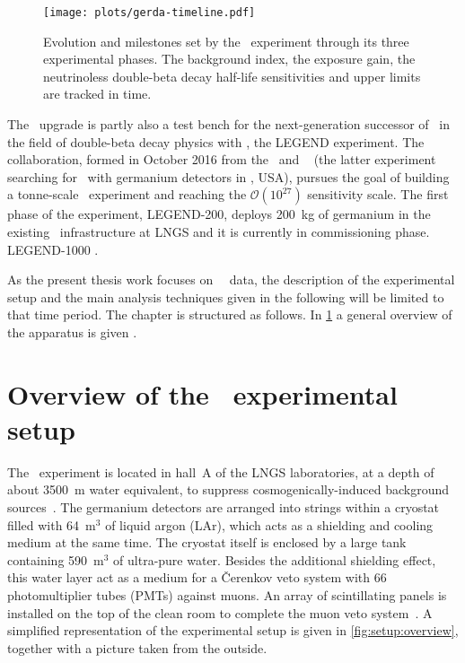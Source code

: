 \begin{figure}
  \centering
  \texttt{[image: plots/gerda-timeline.pdf]}
  \caption{%
    Evolution and milestones set by the \gerda\ experiment through its three experimental
    phases. The background index, the exposure gain, the neutrinoless double-beta decay
    half-life sensitivities and upper limits are tracked in time.
  }
\end{figure}

The \phasetwop\ upgrade is partly also a test bench for the next-generation successor of
\gerda\ in the field of double-beta decay physics with \gesix, the LEGEND experiment. The
collaboration, formed in October 2016 from the \gerda\ and \majorana~\cite{Abgrall2014}
(the latter experiment searching for \onbb\ with germanium detectors in \fillme, USA),
pursues the goal of building a tonne-scale \gesix\ experiment and reaching the
$\mathcal{O}(10^{27})$ sensitivity scale. The first phase of the experiment, LEGEND-200,
deploys 200~kg of germanium in the existing \gerda\ infrastructure at LNGS and it is
currently in commissioning phase. LEGEND-1000 \fillme.

As the present thesis work focuses on \gerda\ \phasetwo\ data, the description of the
experimental setup and the main analysis techniques given in the following will be limited
to that time period. The chapter is structured as follows. In
\cref{sec:gerda:setup} a general overview of the apparatus is given \fillme.

\section{Overview of the \phasetwo\ experimental setup}\label{sec:gerda:setup}

The \gerda\ experiment is located in hall~A of the LNGS laboratories, at a depth of about
3500~m water equivalent, to suppress cosmogenically-induced background
sources~\cite{Wiesinger2018}. The
germanium detectors are arranged into strings within a cryostat filled with 64~m$^3$ of
liquid argon (LAr), which acts as a shielding and cooling medium at the same time. The
cryostat itself is enclosed by a large tank containing 590~m$^3$ of ultra-pure water.
Besides the additional shielding effect, this water layer act as a medium for a
\v{C}erenkov veto system with 66 photomultiplier tubes (PMTs) against muons. An array of
scintillating panels is installed on the top of the clean room to complete the muon veto
system~\cite{Freund2016}. A simplified representation of the experimental setup is given
in \cref{fig:setup:overview}, together with a picture taken from the outside.


